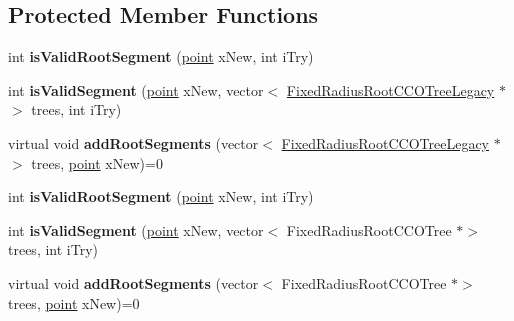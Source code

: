 \subsection*{Protected Member Functions}
\begin{DoxyCompactItemize}
\item 
\mbox{\label{class_abstract_c_c_o_tree_generator_ae692841a924a40eed1a4a23d3d9910cb}} 
int {\bfseries is\+Valid\+Root\+Segment} (\hyperlink{structpoint}{point} x\+New, int i\+Try)
\item 
\mbox{\label{class_abstract_c_c_o_tree_generator_a7e971a13795a519702083f1f199a8d97}} 
int {\bfseries is\+Valid\+Segment} (\hyperlink{structpoint}{point} x\+New, vector$<$ \hyperlink{class_fixed_radius_root_c_c_o_tree_legacy}{Fixed\+Radius\+Root\+C\+C\+O\+Tree\+Legacy} $\ast$$>$ trees, int i\+Try)
\item 
\mbox{\label{class_abstract_c_c_o_tree_generator_a2b1836a3d2c3eaf7ffb992ba485b139d}} 
virtual void {\bfseries add\+Root\+Segments} (vector$<$ \hyperlink{class_fixed_radius_root_c_c_o_tree_legacy}{Fixed\+Radius\+Root\+C\+C\+O\+Tree\+Legacy} $\ast$$>$ trees, \hyperlink{structpoint}{point} x\+New)=0
\item 
\mbox{\label{class_abstract_c_c_o_tree_generator_ae692841a924a40eed1a4a23d3d9910cb}} 
int {\bfseries is\+Valid\+Root\+Segment} (\hyperlink{structpoint}{point} x\+New, int i\+Try)
\item 
\mbox{\label{class_abstract_c_c_o_tree_generator_a6061f7fc5a82d441355d88f246a067b9}} 
int {\bfseries is\+Valid\+Segment} (\hyperlink{structpoint}{point} x\+New, vector$<$ Fixed\+Radius\+Root\+C\+C\+O\+Tree $\ast$$>$ trees, int i\+Try)
\item 
\mbox{\label{class_abstract_c_c_o_tree_generator_a2e659c45f1f8b26a8b216e83571e37a2}} 
virtual void {\bfseries add\+Root\+Segments} (vector$<$ Fixed\+Radius\+Root\+C\+C\+O\+Tree $\ast$$>$ trees, \hyperlink{structpoint}{point} x\+New)=0
\end{DoxyCompactItemize}
